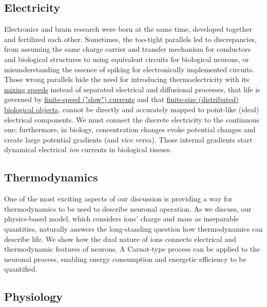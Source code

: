 \subsection*{Electricity\label{sec:StateElectricity}}
Electronics and brain research were born at the same time, 
developed together and fertilized each other. Sometimes,
the too-tight parallels led to discrepancies, from assuming
the same charge carrier and transfer mechanism for conductors and biological structures to using 
equivalent circuits for biological neurons, or misunderstanding the essence of spiking for
electronically implemented circuits. Those wrong parallels hide the need for
introducing thermoelectricity with its \hyperlink{MixingSpeeds}{mixing speeds} instead of separated electrical and diffusional processes,
that life is governed by \hyperlink{slow_current}{finite-speed ("slow") currents} and that \hyperlink{finite_size}{finite-size (distributed) biological objects}, cannot be
directly and accurately mapped to point-like (ideal) electrical components.
We must connect the discrete electricity to the continuous one; furthermore,
in biology, concentration changes evoke potential changes and create large potential gradients (and vice versa).
Those internal gradients start dynamical electrical \textit{ion} currents in biological tissues.

\subsection*{Thermodynamics\label{sec:StateThermodynamics}}
One of the most exciting aspects of our discussion is providing a
way for thermodynamics to be used to describe neuronal operation.
As we discuss, our physics-based model, which considers
ions' charge and mass as inseparable quantities, naturally answers the long-standing
question how thermodynamics can describe life. We show how the dual nature of ions connects electrical and thermodynamic features of neurons.
A Carnot-type process can be applied to the neuronal process, enabling energy consumption and energetic efficiency to be quantified.

\subsection*{Physiology\label{sec:StatePhysiology}}

